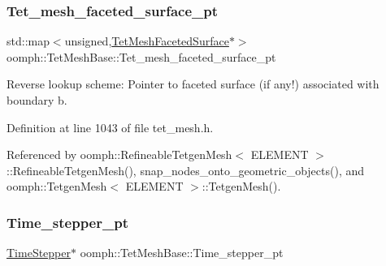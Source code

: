 \mbox{\label{classoomph_1_1TetMeshBase_a6d73f6699d303ec13a1f39c97b2e2c27}} 
\subsubsection{\texorpdfstring{Tet\+\_\+mesh\+\_\+faceted\+\_\+surface\+\_\+pt}{Tet\_mesh\_faceted\_surface\_pt}}
{\footnotesize\ttfamily std\+::map$<$unsigned,\hyperlink{classoomph_1_1TetMeshFacetedSurface}{Tet\+Mesh\+Faceted\+Surface}$\ast$$>$ oomph\+::\+Tet\+Mesh\+Base\+::\+Tet\+\_\+mesh\+\_\+faceted\+\_\+surface\+\_\+pt\hspace{0.3cm}{\ttfamily [protected]}}



Reverse lookup scheme\+: Pointer to faceted surface (if any!) associated with boundary b. 



Definition at line 1043 of file tet\+\_\+mesh.\+h.



Referenced by oomph\+::\+Refineable\+Tetgen\+Mesh$<$ E\+L\+E\+M\+E\+N\+T $>$\+::\+Refineable\+Tetgen\+Mesh(), snap\+\_\+nodes\+\_\+onto\+\_\+geometric\+\_\+objects(), and oomph\+::\+Tetgen\+Mesh$<$ E\+L\+E\+M\+E\+N\+T $>$\+::\+Tetgen\+Mesh().

\mbox{\label{classoomph_1_1TetMeshBase_a4cbd314c973492b0f6e50df69075f2a0}} 
\subsubsection{\texorpdfstring{Time\+\_\+stepper\+\_\+pt}{Time\_stepper\_pt}}
{\footnotesize\ttfamily \hyperlink{classoomph_1_1TimeStepper}{Time\+Stepper}$\ast$ oomph\+::\+Tet\+Mesh\+Base\+::\+Time\+\_\+stepper\+\_\+pt\hspace{0.3cm}{\ttfamily [protected]}}



